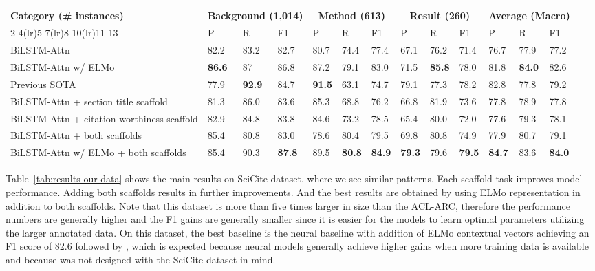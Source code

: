 \documentclass[11pt,a4paper]{article}
\newcommand{\acldata}{ACL-ARC\xspace}
\newcommand{\ourdata}{SciCite\xspace}
\begin{document}
\begin{table*}[!htbp]
\tiny
\setlength{\tabcolsep}{6.3pt}
\renewcommand{\arraystretch}{1.4}
\centering
\begin{tabular}{@{}llllllllllllll@{}}
\toprule
Category (\# instances) & \multicolumn{3}{c}{Background (1,014)} & \multicolumn{3}{c}{Method (613)} & \multicolumn{3}{c}{Result (260)} & \multicolumn{3}{c}{Average (Macro)} \\
\cmidrule(lr){2-4}\cmidrule(lr){5-7}\cmidrule(lr){8-10}\cmidrule(lr){11-13}
 & P & R & F1 & P & R & F1 & P & R & F1 & P & R & F1 \\ \midrule
BiLSTM-Attn & 82.2 & 83.2 & 82.7 & 80.7 & 74.4 & 77.4 & 67.1 & 76.2 & 71.4 & 76.7 & 77.9 & 77.2  \\
BiLSTM-Attn w/ ELMo & \bf{86.6} & 87 & 86.8 & 87.2 & 79.1 & 83.0 & 71.5 & \bf{85.8} & 78.0 & 81.8 & \bf{84.0} & 82.6  \\
Previous SOTA \cite{jurgens2018} & 77.9 & \bf{92.9} & 84.7 & \bf{91.5} & 63.1 & 74.7 & 79.1 & 77.3 & 78.2 & 82.8 & 77.8 & 79.2 \\
\hdashline
BiLSTM-Attn + section title scaffold & 81.3 & 86.0 & 83.6 & 85.3 & 68.8 & 76.2 & 66.8 & 81.9 & 73.6 & 77.8 & 78.9 & 77.8 \\
BiLSTM-Attn + citation worthiness scaffold & 82.9 & 84.8 & 83.8 & 84.6 & 73.2 & 78.5 & 65.4 & 80.0 & 72.0 & 77.6 & 79.3 & 78.1 \\
BiLSTM-Attn + both scaffolds & 85.4 & 80.8 & 83.0 & 78.6 & 80.4 & 79.5 & 69.8 & 80.8 & 74.9 & 77.9 & 80.7 & 79.1 \\
BiLSTM-Attn w/ ELMo + both scaffolds & 85.4 & 90.3 & \bf{87.8} & 89.5 & \bf{80.8} & \bf{84.9} & \bf{79.3} & 79.6 & \bf{79.5} & \bf{84.7} & 83.6 & \bf{84.0} \\ \bottomrule
\end{tabular}
\caption{Detailed per category classification results on the \ourdata dataset. }
\label{tab:results-per-category-scienecite}
\end{table*}



Table~\ref{tab:results-our-data} shows the main results on \ourdata dataset, where we see similar patterns. Each scaffold task improves model performance. Adding both scaffolds results in further improvements. And the best results are obtained by using ELMo representation in addition to both scaffolds.
Note that this dataset is more than five times larger in size than the \acldata, therefore the performance numbers are generally higher and the F1 gains are generally smaller since it is easier for the models to learn optimal parameters utilizing the larger annotated data.
On this dataset, the best baseline is the neural baseline with addition of ELMo contextual vectors achieving an F1 score of 82.6 followed by \citet{jurgens2018}, which is expected because neural models generally achieve higher gains when more training data is available and because \citet{jurgens2018} was not designed with the \ourdata dataset in mind.
\end{document}
